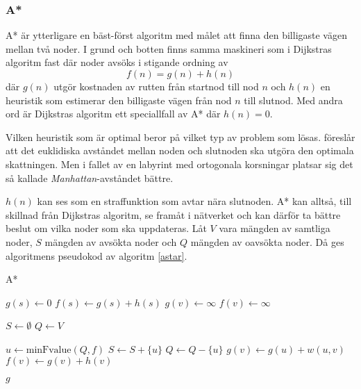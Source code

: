 \documentclass[11pt]{article}
\begin{document}
\begin{flushleft}
\subsubsection{A*}
A* är ytterligare en bäst-först algoritm med målet att finna den billigaste vägen mellan två noder. I grund och botten finns samma maskineri som i Dijkstras algoritm fast där noder avsöks i stigande ordning av
\begin{equation*}
	f(n) = g(n) + h(n)
\end{equation*}
där $g(n)$ utgör kostnaden av rutten från startnod till nod $n$ och $h(n)$ en heuristik som estimerar den billigaste vägen från nod $n$ till slutnod. Med andra ord är Dijkstras algoritm ett speciallfall av A* där $h(n) = 0$.

Vilken heuristik som är optimal beror på vilket typ av problem som lösas. \cite{aStar} föreslår att det euklidiska avståndet mellan noden och slutnoden ska utgöra den optimala skattningen. Men i fallet av en labyrint med ortogonala korsningar platsar sig det så kallade \emph{Manhattan}-avståndet bättre.

$h(n)$ kan ses som en straffunktion som avtar nära slutnoden. A* kan alltså, till skillnad från Dijkstras algoritm, se framåt i nätverket och kan därför ta bättre beslut om vilka noder som ska uppdateras. Låt $V$ vara mängden av samtliga noder, $S$ mängden av avsökta noder och $Q$ mängden av oavsökta noder. Då ges algoritmens pseudokod av algoritm \ref{astar}.

\begin{algorithm}[H]
	\caption{A*} \label{astar}
	\begin{algorithmic}[1]
			\State $g(s) \gets 0$
			\State $f(s) \gets g(s) + h(s)$
				\State $g(v) \gets \infty$
				\State $f(v) \gets \infty$
			\EndFor
			
			\State $S \gets \emptyset$
			\State $Q \gets V$
			
				\State $u \gets \textrm{minFvalue}(Q,f)$%
				\State $S \gets S +  \{ u\}$
				\State $Q \gets Q - \{ u\}$
						\State $g(v) \gets g(u) + w(u,v)$
						\State $f(v) \gets g(v) + h(v)$
					\EndIf
				\EndFor
			\EndWhile
			
			\Return $g$
		\EndFunction
	\end{algorithmic}
\end{algorithm}


\end{flushleft}
\end{document}
